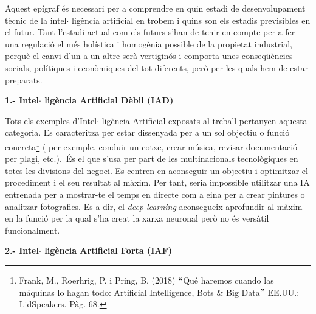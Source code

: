 \documentclass[12pt]{article}
\renewcommand{\_}{\kern-1.5pt\textunderscore\kern-1.5pt}
\begin{document}
\begin{itemize}
\vspace{\baselineskip}
\begin{justify}
Aquest epígraf és necessari per a comprendre en quin estadi de desenvolupament tècnic de la intel$ \cdot $ ligència artificial en trobem i quins son els estadis previsibles en el futur. Tant l’estadi actual com els futurs s’han de tenir en compte per a fer una regulació el més holística i homogènia possible de la propietat industrial, perquè el canvi d’un a un altre serà vertiginós i comporta unes conseqüències socials, polítiques i econòmiques del tot diferents, però per les quals hem de estar preparats.
\end{justify}\par


\vspace{\baselineskip}
\textbf{1.- Intel$ \cdot $ ligència Artificial Dèbil (IAD)}\par


\vspace{\baselineskip}
\begin{justify}
Tots els exemples d’Intel$ \cdot $ ligència Artificial exposats al treball pertanyen aquesta categoria. Es caracteritza per estar dissenyada per a un sol objectiu o funció concreta\footnote{ Frank, M., Roerhrig, P. i Pring, B. (2018) $``$Qué haremos cuando las máquinas lo hagan todo: Artificial Intelligence, Bots $\&$  Big Data$"$  EE.UU.: LidSpeakers. Pàg. 68.  } ( per exemple, conduir un cotxe, crear música, revisar documentació per plagi, etc.).\  És el que s’usa per part de les multinacionals tecnològiques en totes les divisions del negoci. Es centren en aconseguir un objectiu i optimitzar el procediment i el seu resultat al màxim. Per tant, seria impossible utilitzar una IA entrenada per a mostrar-te el temps en directe com a eina per a crear pintures o analitzar fotografies. Es a dir, el \textit{deep learning} aconsegueix aprofundir al màxim en la funció per la qual s’ha creat la xarxa neuronal però no és versàtil funcionalment.
\end{justify}\par


\vspace{\baselineskip}
\textbf{2.- Intel$ \cdot $ ligència Artificial Forta (IAF)}\par



\end{itemize}
\end{document}
